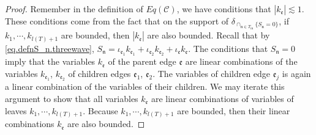 \begin{proof}
Remember in the definition of $Eq(\mathcal{C})$, we have conditions that $|k_{\mathfrak{e}}|\lesssim 1$. These conditions come from the fact that on the support of $\delta_{\cap_{\mathfrak{n}\in T_{\text{in}}} \{S_{\mathfrak{n}}=0\}}$, if $k_1,\cdots,k_{l(T)+1}$ are bounded, then $|k_{\mathfrak{e}}|$ are also bounded. Recall that by \eqref{eq.defnS_n.threewave}, $S_{\mathfrak{n}}=\iota_{\mathfrak{e}_1}k_{\mathfrak{e}_1}+\iota_{\mathfrak{e}_2}k_{\mathfrak{e}_2}+\iota_{\mathfrak{e}}k_{\mathfrak{e}}$. The conditions that $S_{\mathfrak{n}}=0$ imply that the variables $k_{\mathfrak{e}}$ of the parent edge $\mathfrak{e}$ are linear combinations of the variables $k_{\mathfrak{e}_1}$, $k_{\mathfrak{e}_2}$ of children edges $\mathfrak{e}_1$, $\mathfrak{e}_2$. The variables of children edge $\mathfrak{e}_j$ is again a linear combination of the variables of their children. We may iterate this argument to show that all variables $k_{\mathfrak{e}}$ are linear combinations of variables of leaves $k_1,\cdots,k_{l(T)+1}$. Because $k_1,\cdots,k_{l(T)+1}$ are bounded, then their linear combinations $k_{\mathfrak{e}}$ are also bounded.


\end{proof}
